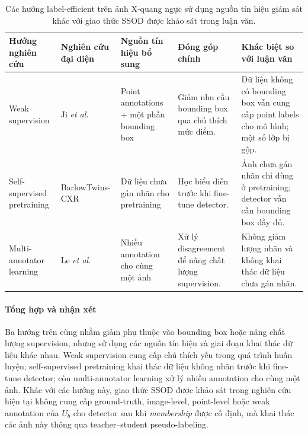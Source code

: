\documentclass[pdflatex,sn-mathphys-num]{sn-jnl}%
\theoremstyle{thmstyleone}%
\theoremstyle{thmstyletwo}%
\theoremstyle{thmstylethree}%
\begin{document}
\begin{table}[!ht]
\caption{Các hướng label-efficient trên ảnh X-quang ngực sử dụng nguồn tín hiệu giám sát khác với giao thức SSOD được khảo sát trong luận văn.}
\label{tab:cxr_label_efficient_methods}
\centering
\scriptsize
\begin{tabularx}{\textwidth}{
>{\raggedright\arraybackslash}m{2.3cm} >{\raggedright\arraybackslash}m{3.2cm}
>{\raggedright\arraybackslash}X >{\raggedright\arraybackslash}X
>{\raggedright\arraybackslash}X}
\toprule
\textbf{Hướng nghiên cứu} & \textbf{Nghiên cứu đại diện} &
\textbf{Nguồn tín hiệu bổ sung} & \textbf{Đóng góp chính} &
\textbf{Khác biệt so với luận văn} \\
\midrule
Weak supervision & Ji \textit{et al.} \cite{ji2022benchmark} &
Point annotations + một phần bounding box &
Giảm nhu cầu bounding box qua chú thích mức điểm. &
Dữ liệu không có bounding box vẫn cung cấp point labels cho mô hình; một số lớp bị gộp. \\
Self-supervised pretraining & BarlowTwins-CXR \cite{sheng2024barlowtwins} &
Dữ liệu chưa gán nhãn cho pretraining &
Học biểu diễn trước khi fine-tune detector. &
Ảnh chưa gán nhãn chỉ dùng ở pretraining; detector vẫn cần bounding box đầy đủ. \\
Multi-annotator learning & Le \textit{et al.} \cite{le2023learning} &
Nhiều annotation cho cùng một ảnh &
Xử lý disagreement để nâng chất lượng supervision. &
Không giảm lượng nhãn và không khai thác dữ liệu chưa gán nhãn. \\
\bottomrule
\end{tabularx}
\end{table}
 
\paragraph{Tổng hợp và nhận xét}
Ba hướng trên cùng nhằm giảm phụ thuộc vào bounding box hoặc nâng chất lượng
supervision, nhưng sử dụng các nguồn tín hiệu và giai đoạn khai thác dữ liệu
khác nhau. Weak supervision cung cấp chú thích yếu trong quá trình huấn luyện;
self-supervised pretraining khai thác dữ liệu không nhãn trước khi fine-tune
detector; còn multi-annotator learning xử lý nhiều annotation cho cùng một ảnh.
Khác với các hướng này, giao thức SSOD được khảo sát trong nghiên cứu hiện tại
không cung cấp ground-truth, image-level, point-level hoặc weak annotation của
\(U_b\) cho detector sau khi \textit{membership} được cố định, mà khai thác các
ảnh này thông qua teacher--student pseudo-labeling.
\end{document}
